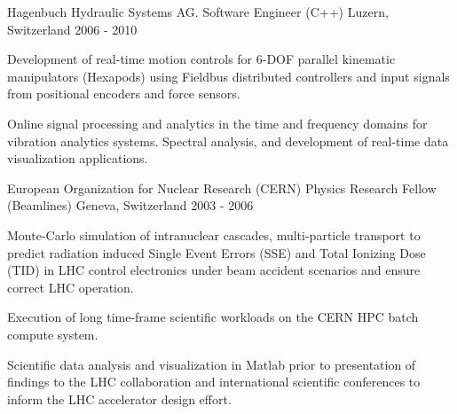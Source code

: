 \begin{cventries}
\cventry
{Hagenbuch Hydraulic Systems AG.} %
{Software Engineer (C++)} %
{Luzern, Switzerland} %
{2006 - 2010} %
{
  \begin{cvitems} %
    \item {
      Development of real-time motion controls for 6-DOF parallel 
      kinematic manipulators (Hexapods) using Fieldbus distributed controllers 
      and input signals from positional encoders and force sensors.}
    \item {
      Online signal processing and analytics in the time and frequency domains for 
      vibration analytics systems. Spectral analysis, and development of 
      real-time data visualization applications.}
  \end{cvitems}
}

\cventry
{European Organization for Nuclear Research (CERN)} %
{Physics Research Fellow (Beamlines)} %
{Geneva, Switzerland} %
{2003 - 2006} %
{
  \begin{cvitems} %
    \item {
      Monte-Carlo simulation of intranuclear cascades, multi-particle 
      transport to predict radiation induced Single Event Errors (SSE) and 
      Total Ionizing Dose (TID) in LHC control electronics under 
      beam accident scenarios and ensure correct LHC operation.}
      \item {
        Execution of long time-frame scientific workloads on the CERN HPC 
        batch compute system.
        }  
      \item{
      Scientific data analysis and visualization in Matlab prior to presentation 
      of findings to the LHC collaboration and international scientific conferences
      to inform the LHC accelerator design effort.}
  \end{cvitems}
}


\end{cventries}
